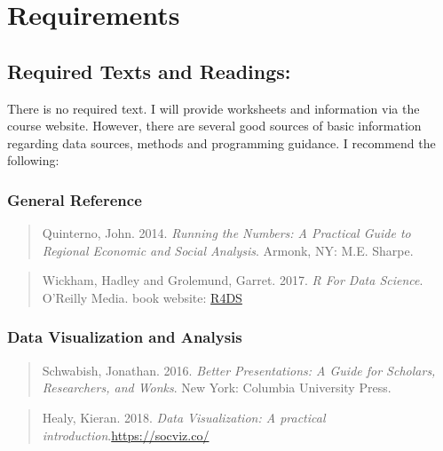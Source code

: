 \documentclass[11pt,]{article}
\begin{document}
\hypertarget{requirements}{%
\section{Requirements}\label{requirements}}

\hypertarget{required-texts-and-readings}{%
\subsection{Required Texts and
Readings:}\label{required-texts-and-readings}}

There is no required text. I will provide worksheets and information via
the course website. However, there are several good sources of basic
information regarding data sources, methods and programming guidance. I
recommend the following:

\hypertarget{general-reference}{%
\subsubsection{General Reference}\label{general-reference}}

\begin{quote}
Quinterno, John. 2014. \emph{Running the Numbers: A Practical Guide to
Regional Economic and Social Analysis}. Armonk, NY: M.E. Sharpe.
\end{quote}

\begin{quote}
Wickham, Hadley and Grolemund, Garret. 2017. \emph{R For Data Science}.
O'Reilly Media. book website: \href{https://r4ds.had.co.nz/}{R4DS}
\end{quote}

\hypertarget{data-visualization-and-analysis}{%
\subsubsection{Data Visualization and
Analysis}\label{data-visualization-and-analysis}}

\begin{quote}
Schwabish, Jonathan. 2016. \emph{Better Presentations: A Guide for
Scholars, Researchers, and Wonks}. New York: Columbia University Press.
\end{quote}

\begin{quote}
Healy, Kieran. 2018. \emph{Data Visualization: A practical
introduction}.\url{https://socviz.co/}
\end{quote}
\end{document}

